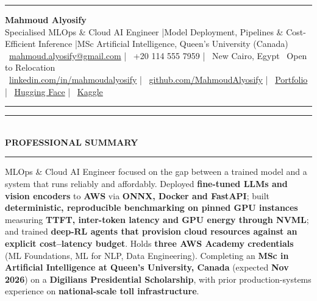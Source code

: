 \documentclass[10pt, a4paper]{article}
\newcommand{\faEnvelope}{}\newcommand{\faPhone}{}\newcommand{\faMapMarker}{}%
\newcommand{\faLinkedin}{}\newcommand{\faGithub}{}\newcommand{\faRobot}{}%
\newcommand{\faChartBar}{}\newcommand{\faGlobe}{}%
\newcommand{\cvsection}[1]{%
  \vspace{3pt}%
  {\color{navy}\rule{\linewidth}{1.1pt}}\\[0.5pt]%
  {\color{navy}\bfseries\fontsize{9.5}{11}\selectfont\uppercase{#1}}\\[-4pt]%
  {\color{teal}\rule{\linewidth}{0.6pt}}%
  \vspace{2pt}%
}
\begin{document}
\small

{\color{navy}\rule{\linewidth}{1.5pt}}

\vspace{3pt}
\begin{center}
  {\fontsize{21}{24}\bfseries\color{navy} Mahmoud Alyosify}\\[3pt]
  {\fontsize{10}{12}\color{teal}
    Specialised MLOps \& Cloud AI Engineer \enspace|\enspace Model Deployment, Pipelines \& Cost-Efficient Inference
    \enspace|\enspace MSc Artificial Intelligence, Queen's University (Canada)
}\\[4pt]
  {\color{midgray}
    \faEnvelope\ \href{mailto:mahmoud.alyosify@gmail.com}{mahmoud.alyosify@gmail.com}
    \enspace|\enspace
    \faPhone\ +20 114 555 7959
    \enspace|\enspace
    \faMapMarker\ New Cairo, Egypt \textperiodcentered\ Open to Relocation}\\[2pt]
  {\faLinkedin\ \href{https://linkedin.com/in/mahmoudalyosify}{linkedin.com/in/mahmoudalyosify}
    \enspace|\enspace
    \faGithub\ \href{https://github.com/MahmoudAlyosify}{github.com/MahmoudAlyosify}
    \enspace|\enspace
    \faGlobe\ \href{https://mahmoudalyosifysite.github.io/}{Portfolio}
    \enspace|\enspace
    \faRobot\ \href{https://huggingface.co/mahmoudalyosify}{Hugging Face}
    \enspace|\enspace
    \faChartBar\ \href{https://kaggle.com/mahmoudalyosify}{Kaggle}}
\end{center}

{\color{navy}\rule{\linewidth}{1.5pt}}

\vspace{2pt}

\cvsection{Professional Summary}

{\color{darkgray}\justifying
MLOps \& Cloud AI Engineer focused on the gap between a trained model and a system that runs reliably and affordably. Deployed \textbf{fine-tuned LLMs and vision encoders} to \textbf{AWS} via \textbf{ONNX, Docker and FastAPI}; built \textbf{deterministic, reproducible benchmarking on pinned GPU instances} measuring \textbf{TTFT, inter-token latency and GPU energy through NVML}; and trained \textbf{deep-RL agents that provision cloud resources against an explicit cost--latency budget}. Holds \textbf{three AWS Academy credentials} (ML Foundations, ML for NLP, Data Engineering). Completing an \textbf{MSc in Artificial Intelligence at Queen's University, Canada} (expected \textbf{Nov 2026}) on a \textbf{Digilians Presidential Scholarship}, with prior production-systems experience on \textbf{national-scale toll infrastructure}.}
\end{document}
